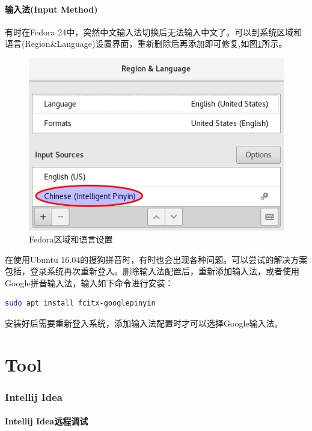 \documentclass[letter]{book}
\begin{document}
\subsection{输入法(Input Method)}

有时在Fedora 24中，突然中文输入法切换后无法输入中文了。可以到系统区域和语言(Region\&Language)设置界面，重新删除后再添加即可修复,如图\ref{fig:regionandlanguagesetting}所示。

\begin{figure}[htbp]
	\centering
	\includegraphics[scale=0.6]{regionandlanguagesetting.jpg}
	\caption{Fedora区域和语言设置}
	\label{fig:regionandlanguagesetting}
\end{figure}

在使用Ubuntu 16.04的搜狗拼音时，有时也会出现各种问题。可以尝试的解决方案包括，登录系统再次重新登入。删除输入法配置后，重新添加输入法，或者使用Google拼音输入法，输入如下命令进行安装：

\begin{lstlisting}[language=Bash]
sudo apt install fcitx-googlepinyin
\end{lstlisting}

安装好后需要重新登入系统，添加输入法配置时才可以选择Google输入法。

\part{Tool}

\newpage

\section{Intellij Idea}

\subsection{Intellij Idea远程调试}
\end{document}
